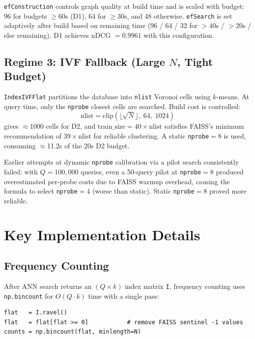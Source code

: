 \documentclass[11pt,a4paper]{article}
\newcommand{\code}[1]{\texttt{\small #1}}
\begin{document}
\texttt{efConstruction} controls graph quality at build time and is scaled with budget:
96 for budgets $\geq 60$s (D1), 64 for $\geq 30$s, and 48 otherwise. \texttt{efSearch}
is set adaptively after build based on remaining time (96 / 64 / 32 for
$>40$s / $>20$s / else remaining). D1 achieves nDCG $= 0.9961$ with this
configuration.

\subsection{Regime 3: IVF Fallback (Large $N$, Tight Budget)}

\code{IndexIVFFlat} partitions the database into \texttt{nlist} Voronoi cells
using $k$-means. At query time, only the \texttt{nprobe} closest cells are
searched. Build cost is controlled:
\[
  \text{nlist} = \mathrm{clip}\!\left(\lfloor\sqrt{N}\rfloor,\; 64,\; 1024\right)
\]
gives ${\approx}1000$ cells for D2, and
$\text{train\_size} = 40 \times \text{nlist}$ satisfies FAISS's minimum
recommendation of $39 \times \text{nlist}$ for reliable clustering. A static
\texttt{nprobe}$=8$ is used, consuming $\approx$11.2s of the 20s D2 budget.

Earlier attempts at dynamic \texttt{nprobe} calibration via a pilot search
consistently failed: with $Q=100{,}000$ queries, even a 50-query pilot at
\texttt{nprobe}$=8$ produced overestimated per-probe costs due to FAISS warmup
overhead, causing the formula to select \texttt{nprobe}$=4$ (worse than
static). Static \texttt{nprobe}$=8$ proved more reliable.

\section{Key Implementation Details}

\subsection{Frequency Counting}

After ANN search returns an $(Q \times k)$ index matrix \code{I}, frequency
counting uses \code{np.bincount} for $O(Q \cdot k)$ time with a single pass:

\begin{lstlisting}[style=pycode]
flat   = I.ravel()
flat   = flat[flat >= 0]           # remove FAISS sentinel -1 values
counts = np.bincount(flat, minlength=N)
\end{lstlisting}
\end{document}
